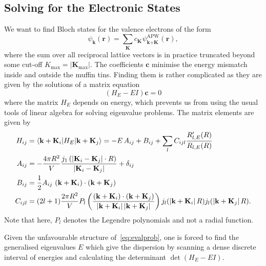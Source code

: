 \documentclass[a4paper,DIV=12,english]{scrartcl}
\begin{document}
\subsection{Solving for the Electronic States}
We want to find Bloch states for the valence electrons of the form 
\begin{equation}
    \psi_\textbf{k}(\textbf{r}) = \sum_\textbf{K} c_\textbf{K} \psi^{\text{APW}}_{\textbf{k} + \textbf{K}}(\textbf{r}),
\end{equation}
where the sum over all reciprocal lattice vectors is in practice truncated beyond some cut-off $K_\text{max} = |\textbf{K}_\text{max}|$.
The coefficients $\textbf{c}$ minimise the energy mismatch inside and outside the muffin tins. Finding them is rather complicated as they are given by the solutions of a matrix equation 
\begin{equation}\label{eq:evalprob}
    (H_E - EI)\textbf{c} = 0
\end{equation}
where the matrix $H_E$ depends on energy, which prevents us from using the usual tools of linear algebra for solving eigenvalue problems. The matrix elements are given by~\cite{Thijssen2007cp}
\begin{align}
    H_{ij} &= \braket{\textbf{k}+\textbf{K}_i|H_E|\textbf{k}+\textbf{K}_j} = -E\,A_{ij} + B_{ij} + \sum_l C_{ijl} \frac{R'_{l, E}(R)}{R_{l, E}(R)} \\
    A_{ij} &= -\frac{4\pi R^2}{V} \frac{j_1\left( \left|\textbf{K}_i - \textbf{K}_j\right|\cdot R \right)}{\left|\textbf{K}_i - \textbf{K}_j\right|} + \delta_{ij} \\
    B_{ij} &= \frac{1}{2}A_{ij}\, \left(\textbf{k}+\textbf{K}_i\right) \cdot \left(\textbf{k}+\textbf{K}_j\right) \\
    C_{ijl} &= (2l+1)\frac{2\pi R^2}{V} P_l\left(\frac{\left(\textbf{k}+\textbf{K}_i\right) \cdot \left(\textbf{k}+\textbf{K}_j\right)}{\left|\textbf{k}+\textbf{K}_i\right| \left|\textbf{k}+\textbf{K}_j\right|}\right) j_l(\left|\textbf{k}+\textbf{K}_i\right|R) j_l(\left|\textbf{k}+\textbf{K}_j\right|R).
\end{align}
Note that here, $P_l$ denotes the Legendre polynomials and not a radial function.

Given the unfavourable structure of~\eqref{eq:evalprob}, one is forced to find the generalised eigenvalues $E$ which give the dispersion by scanning a dense discrete interval of energies and calculating the determinant $\det\left(H_E - EI\right)$.
\end{document}
